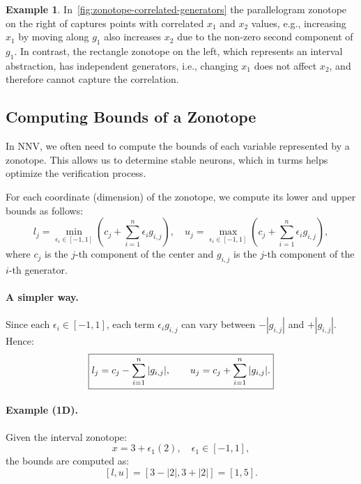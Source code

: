 \documentclass[oneside,11pt,dvipsnames]{book}
\numberwithin{equation}{section}
\theoremstyle{definition}
\newtheorem{example}{Example}[section]
\theoremstyle{remark}
\begin{document}
\begin{example}
In~\autoref{fig:zonotope-correlated-generators} the parallelogram zonotope on the right of captures   points with correlated \(x_1\) and \(x_2\) values, e.g., increasing \(x_1\) by moving along \(g_1\) also increases \(x_2\) due to the non-zero second component of \(g_1\).
In contrast, the rectangle zonotope on the left, which represents an interval abstraction, has independent generators, i.e., changing \(x_1\) does not affect \(x_2\), and therefore cannot capture the correlation.
\end{example}

\subsection{Computing Bounds of a Zonotope}\label{sec:zonotope-bounds}
In NNV, we often need to compute the bounds of each variable represented by a zonotope. This allows us to determine stable neurons, which in turms helps optimize the verification process.

For each coordinate (dimension) of the zonotope, we compute its lower and upper bounds as follows:
\[
l_j = \min_{\epsilon_i \in [-1,1]} \left(c_j + \sum_{i=1}^{n} \epsilon_i g_{i,j}\right),
\quad
u_j = \max_{\epsilon_i \in [-1,1]} \left(c_j + \sum_{i=1}^{n} \epsilon_i g_{i,j}\right),
\]
where \(c_j\) is the \(j\)-th component of the center and \(g_{i,j}\) is the \(j\)-th component of the \(i\)-th generator.

\paragraph{A simpler way.}
Since each \(\epsilon_i \in [-1,1]\), each term \(\epsilon_i g_{i,j}\) can vary between \(-|g_{i,j}|\) and \(+|g_{i,j}|\).
Hence:
\[
\boxed{
l_j = c_j - \sum_{i=1}^{n} |g_{i,j}|, \qquad
u_j = c_j + \sum_{i=1}^{n} |g_{i,j}|.
}
\]

\paragraph{Example (1D).} Given the interval zonotope:
\[
x = 3 + \epsilon_1(2), \quad \epsilon_1 \in [-1,1],
\]
the bounds are computed as:
\[
[l, u] = [3 - |2|, 3 + |2|] = [1, 5].
\]
\end{document}

